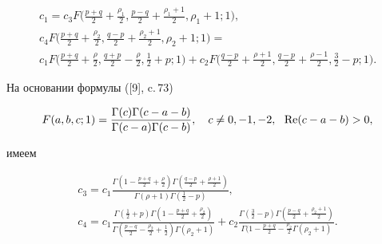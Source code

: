 \begin{gather*} 


c_1 = c_3 F\bigg(\frac{p+ 


q}{2} + \frac{\rho_1}{2},\frac{p - q}{2} + 


\frac{\rho_1 + 1}{2}, \rho_1 + 1 ; 1\bigg),\\ 


% 


c_4 F\bigg(\frac{p+ q}{2} 


+ \frac{\rho_2}{2},\frac{q - p}{2} + 


\frac{\rho_2 + 1}{2}, \rho_2 + 1 ; 1\bigg) = \\ 


% 


c_1 F\bigg(\frac{p+ q}{2} + \frac{\rho}{2}, 


\frac{q+p}{2}-\frac{\rho}{2},\frac12+p;1\bigg)+c_2F\bigg(


\frac{q-p}{2}+\frac{\rho+1}{2},\frac{q-p}{2}+\frac{\rho-1}{2},\frac32 


-p;1\bigg). 


\end{gather*} 


На основании формулы ([9], c.\,73) 


\begin{equation} 


F(a,b,c;1)=\frac{\Gamma(c)\Gamma(c-a-b)} 


{\Gamma(c-a)\Gamma(c-b)},\quad c\ne0,-1,-2,\ \ \re(c-a-b)>0, 


\end{equation} 


имеем 


\begin{gather} 


c_3=c_1\frac{\Gamma(1-\frac{p+q}{2}+\frac{\rho}{2}) 


\Gamma(\frac{q-p}{2}+\frac{\rho+1}{2})} 


{\Gamma(\rho+1)\Gamma(\frac12-p)}, \\ 


% 


c_4=c_1\frac{\Gamma(\frac12+p)\Gamma(1-\frac{p+q}{2}+\frac{\rho_2}{2})} 


{\Gamma(\frac{p-q}{2}-\frac{\rho_2}{2}+\frac12)\Gamma(\rho_2+1)}+ 


c_2\frac{\Gamma(\frac32-p)\Gamma(\frac{p-q}{2}+\frac{\rho_2+1}{2})} 


{\Gamma(1-\frac{p+q}{2}-\frac{\rho_2}{2}\Gamma(\rho_2+1)}. 


\end{gather} 


